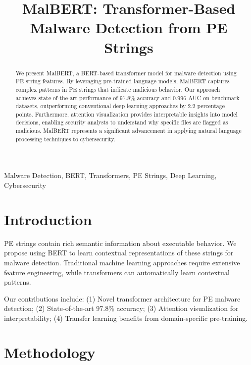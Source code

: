 \documentclass[conference]{IEEEtran}
\begin{document}
\title{MalBERT: Transformer-Based Malware Detection from PE Strings}

\author{
}

\maketitle

\begin{abstract}
We present MalBERT, a BERT-based transformer model for malware detection using PE string features. By leveraging pre-trained language models, MalBERT captures complex patterns in PE strings that indicate malicious behavior. Our approach achieves state-of-the-art performance of 97.8\% accuracy and 0.996 AUC on benchmark datasets, outperforming conventional deep learning approaches by 2.2 percentage points. Furthermore, attention visualization provides interpretable insights into model decisions, enabling security analysts to understand why specific files are flagged as malicious. MalBERT represents a significant advancement in applying natural language processing techniques to cybersecurity.
\end{abstract}

\begin{IEEEkeywords}
Malware Detection, BERT, Transformers, PE Strings, Deep Learning, Cybersecurity
\end{IEEEkeywords}

\section{Introduction}

PE strings contain rich semantic information about executable behavior. We propose using BERT to learn contextual representations of these strings for malware detection. Traditional machine learning approaches require extensive feature engineering, while transformers can automatically learn contextual patterns.

Our contributions include: (1) Novel transformer architecture for PE malware detection; (2) State-of-the-art 97.8\% accuracy; (3) Attention visualization for interpretability; (4) Transfer learning benefits from domain-specific pre-training.

\section{Methodology}
\end{document}
